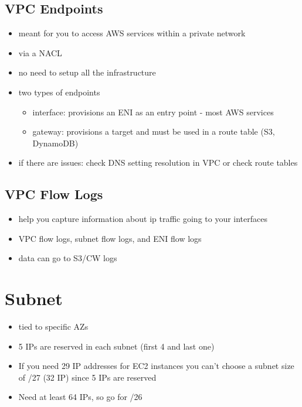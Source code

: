 \documentclass[]{scrartcl}
\begin{document}
\subsection{VPC Endpoints}
\begin{itemize}
	\item meant for you to access AWS services within a private network
	\item via a NACL
	\item no need to setup all the infrastructure
	\item two types of endpoints
	\begin{itemize}
		\item interface: provisions an ENI as an entry point - most AWS services
		\item gateway: provisions a target and must be used in a route table (S3, DynamoDB)
	\end{itemize}
	\item if there are issues: check DNS setting resolution in VPC or check route tables
\end{itemize}

\subsection{VPC Flow Logs}
\begin{itemize}
	\item help you capture information about ip traffic going to your interfaces
	\item VPC flow logs, subnet flow logs, and ENI flow logs
	\item data can go to S3/CW logs
\end{itemize}

\section{Subnet}
\begin{itemize}
	\item tied to specific AZs
	\item 5 IPs are reserved in each subnet (first 4 and last one)
	\item If you need 29 IP addresses for EC2 instances you can't choose a subnet size of /27 (32 IP) since 5 IPs are reserved
	\item Need at least 64 IPs, so go for /26
\end{itemize}
\end{document}
